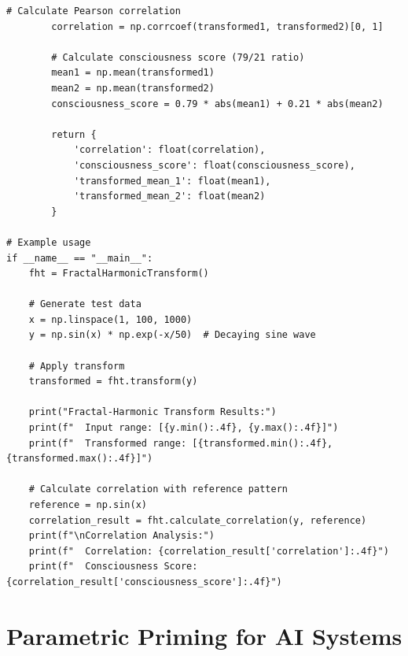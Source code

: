 \begin{lstlisting}[caption={Fractal-Harmonic Transform Implementation},label={code:fractal_harmonic}]
        # Calculate Pearson correlation
        correlation = np.corrcoef(transformed1, transformed2)[0, 1]
        
        # Calculate consciousness score (79/21 ratio)
        mean1 = np.mean(transformed1)
        mean2 = np.mean(transformed2)
        consciousness_score = 0.79 * abs(mean1) + 0.21 * abs(mean2)
        
        return {
            'correlation': float(correlation),
            'consciousness_score': float(consciousness_score),
            'transformed_mean_1': float(mean1),
            'transformed_mean_2': float(mean2)
        }

# Example usage
if __name__ == "__main__":
    fht = FractalHarmonicTransform()
    
    # Generate test data
    x = np.linspace(1, 100, 1000)
    y = np.sin(x) * np.exp(-x/50)  # Decaying sine wave
    
    # Apply transform
    transformed = fht.transform(y)
    
    print("Fractal-Harmonic Transform Results:")
    print(f"  Input range: [{y.min():.4f}, {y.max():.4f}]")
    print(f"  Transformed range: [{transformed.min():.4f}, {transformed.max():.4f}]")
    
    # Calculate correlation with reference pattern
    reference = np.sin(x)
    correlation_result = fht.calculate_correlation(y, reference)
    print(f"\nCorrelation Analysis:")
    print(f"  Correlation: {correlation_result['correlation']:.4f}")
    print(f"  Consciousness Score: {correlation_result['consciousness_score']:.4f}")
\end{lstlisting}

\section{Parametric Priming for AI Systems}

